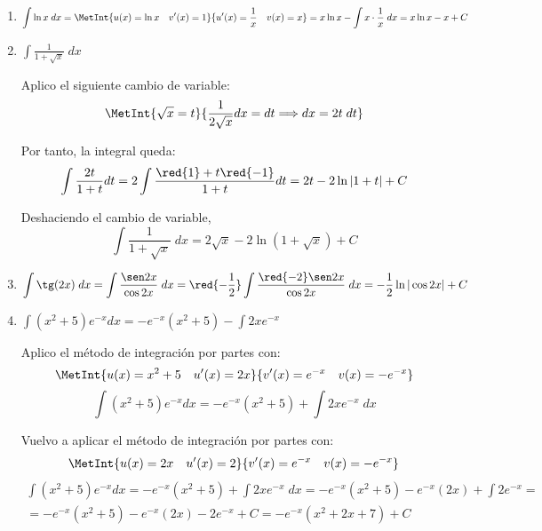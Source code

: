 \begin{ejercicio}
\begin{enumerate}
    \item $\displaystyle \int \ln x\; dx = \MetInt{u(x)=\ln x \quad v'(x)=1}{u'(x)=\frac{1}{x} \quad v(x)=x} = x\ln x -\int x\cdot \frac{1}{x}\;dx = x\ln x -x + C$ 

    \item $\displaystyle \int \frac{1}{1+\sqrt{x}}\;dx$

    Aplico el siguiente cambio de variable:
    \begin{equation*}
        \MetInt{\sqrt{x}=t}{\frac{1}{2\sqrt{x}}dx = dt \Longrightarrow dx=2t\;dt}
    \end{equation*}

    Por tanto, la integral queda:
    \begin{equation*}
        \int\frac{2t}{1+t}dt = 2\int \frac{\red{1}+t\red{-1}}{1+t}dt = 2t-2\ln |1+t|+C
    \end{equation*}

    Deshaciendo el cambio de variable,
    \begin{equation*}
        \int \frac{1}{1+\sqrt{x}}\;dx = 2\sqrt{x}-2\ln (1+\sqrt{x})+C
    \end{equation*}


    \item $\displaystyle \int \tg(2x)\;dx = \int \frac{\sen 2x}{\cos 2x}\;dx = \red{-\frac{1}{2}} \int \frac{\red{-2}\sen 2x}{\cos 2x}\;dx = -\frac{1}{2}\ln |\cos 2x|+C$

    \item $\displaystyle \int (x^2+5)e^{-x}dx = -e^{-x}(x^2+5)-\int 2xe^{-x}$

    Aplico el método de integración por partes con:
    \begin{equation*}
         \MetInt{u(x)=x^2+5 \quad u'(x)=2x}{v'(x)=e^{-x}\quad v(x)=-e^{-x}}
    \end{equation*}
    \begin{equation*}
        \int (x^2+5)e^{-x}dx = -e^{-x}(x^2+5)+\int 2xe^{-x}\;dx
    \end{equation*}

    Vuelvo a aplicar el método de integración por partes con:
    \begin{equation*}
         \MetInt{u(x)=2x \quad u'(x)=2}{v'(x)=e^{-x}\quad v(x)=-e^{-x}}
    \end{equation*}
    \begin{multline*}
        \int (x^2+5)e^{-x}dx = -e^{-x}(x^2+5)+\int 2xe^{-x}\;dx
        = -e^{-x}(x^2+5) -e^{-x}(2x)+\int 2e^{-x}
        =\\=
        -e^{-x}(x^2+5) -e^{-x}(2x) -2e^{-x} +C
        = -e^{-x}(x^2+2x+7) +C
    \end{multline*}



\end{enumerate}
\end{ejercicio}
